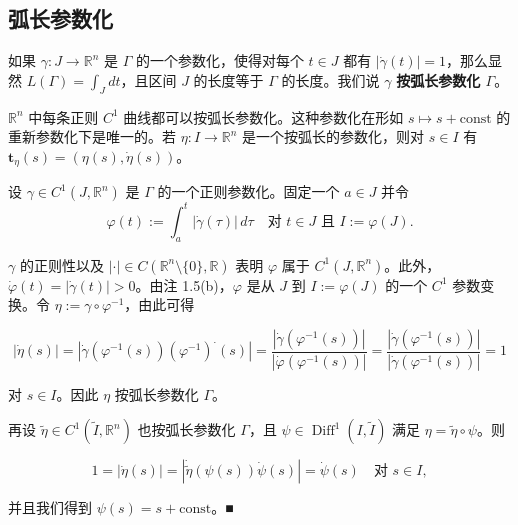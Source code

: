 \subsection*{弧长参数化}

如果 $ \gamma : J \to \mathbb{R}^n $ 是 $ \Gamma $ 的一个参数化，使得对每个 $ t \in J $ 都有 $ |\dot\gamma(t)| = 1 $，那么显然 $ L(\Gamma) = \int_J dt $，且区间 $ J $ 的长度等于 $ \Gamma $ 的长度。我们说 $ \gamma $ \textbf{按弧长参数化 $ \Gamma $}。

\begin{proposition}

$ \mathbb{R}^n $ 中每条正则 $ C^1 $ 曲线都可以按弧长参数化。这种参数化在形如 $ s \mapsto s + \mathrm{const} $ 的重新参数化下是唯一的。若 $ \eta : I \to \mathbb{R}^n $ 是一个按弧长的参数化，则对 $ s \in I $ 有 $ \mathbf{t}_{\eta}(s) = (\eta(s), \dot\eta(s)) $。

\proofhead
设 $ \gamma \in C^1(J, \mathbb{R}^n) $ 是 $ \Gamma $ 的一个正则参数化。固定一个 $ a \in J $ 并令
\[
\varphi(t) := \int_a^t |\dot\gamma(\tau)| \, d\tau \quad \text{对 } t \in J \text{ 且 } I := \varphi(J) .
\]

$ \gamma $ 的正则性以及 $ |\cdot| \in C(\mathbb{R}^n \setminus \{0\}, \mathbb{R}) $ 表明 $ \varphi $ 属于 $ C^1(J, \mathbb{R}^n) $。此外，$ \dot\varphi(t) = |\dot\gamma(t)| > 0 $。由注 1.5(b)，$ \varphi $ 是从 $ J $ 到 $ I := \varphi(J) $ 的一个 $ C^1 $ 参数变换。令 $ \eta := \gamma \circ \varphi^{-1} $，由此可得

\[
|\dot\eta(s)| = |\dot\gamma(\varphi^{-1}(s))(\varphi^{-1})^{\cdot}(s)| = \frac{|\dot\gamma(\varphi^{-1}(s))|}{|\dot\varphi(\varphi^{-1}(s))|} = \frac{|\dot\gamma(\varphi^{-1}(s))|}{|\dot\gamma(\varphi^{-1}(s))|} = 1
\]

对 $ s \in I $。因此 $ \eta $ 按弧长参数化 $ \Gamma $。

再设 $ \tilde\eta \in C^1(\tilde{I}, \mathbb{R}^n) $ 也按弧长参数化 $ \Gamma $，且 $ \psi \in \operatorname{Diff}^1(I, \tilde{I}) $ 满足 $ \eta = \tilde\eta \circ \psi $。则

\[
1 = |\dot\eta(s)| = |\dot{\tilde\eta}(\psi(s))\dot\psi(s)| = \dot\psi(s) \quad \text{对 } s \in I ,
\]

并且我们得到 $ \psi(s) = s + \mathrm{const} $。\nobreak\hspace{0.35em}■

\end{proposition}

